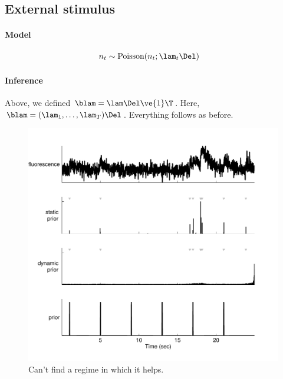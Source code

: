 \subsection{External stimulus}

\paragraph{Model}


\begin{align}
	n_t &\sim \text{Poisson}(n_t; \lam_t \Del)
\end{align}

\paragraph{Inference}

Above, we defined $\blam=\lam\Del\ve{1}\T$.  Here, $\blam=(\lam_1, \ldots, \lam_T) \Del$.  Everything follows as before.

\begin{figure}[h!]
\centering \includegraphics[width=.9\linewidth]{../figs/dynamic_prior}
\caption{Can't find a regime in which it helps.} \label{fig:woopsi}
\end{figure}



